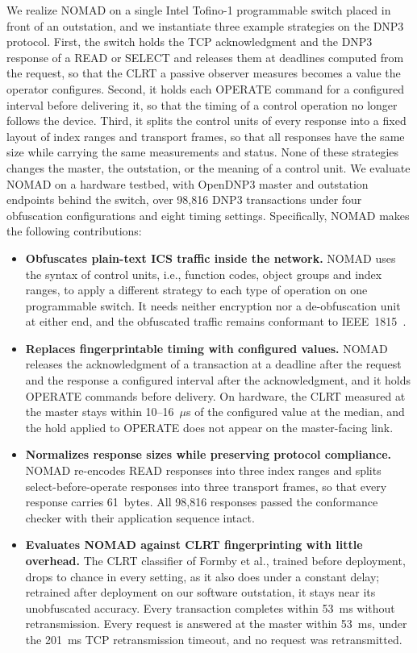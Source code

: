 We realize NOMAD on a single Intel Tofino-1 programmable switch placed in front of an outstation, and we instantiate three example strategies on the DNP3 protocol. First, the switch holds the TCP acknowledgment and the DNP3 response of a READ or SELECT and releases them at deadlines computed from the request, so that the CLRT a passive observer measures becomes a value the operator configures. Second, it holds each OPERATE command for a configured interval before delivering it, so that the timing of a control operation no longer follows the device. Third, it splits the control units of every response into a fixed layout of index ranges and transport frames, so that all responses have the same size while carrying the same measurements and status. None of these strategies changes the master, the outstation, or the meaning of a control unit. We evaluate NOMAD on a hardware testbed, with OpenDNP3 master and outstation endpoints behind the switch, over 98,816 DNP3 transactions under four obfuscation configurations and eight timing settings. Specifically, NOMAD makes the following contributions:

\begin{itemize}[leftmargin=*,labelindent=0pt,topsep=2pt,itemsep=2pt,parsep=0pt]
\item \textbf{Obfuscates plain-text ICS traffic inside the network.} NOMAD uses the syntax of control units, i.e., function codes, object groups and index ranges, to apply a different strategy to each type of operation on one programmable switch. It needs neither encryption nor a de-obfuscation unit at either end, and the obfuscated traffic remains conformant to IEEE~1815~\cite{dnp3std}.
\item \textbf{Replaces fingerprintable timing with configured values.} NOMAD releases the acknowledgment of a transaction at a deadline after the request and the response a configured interval after the acknowledgment, and it holds OPERATE commands before delivery. On hardware, the CLRT measured at the master stays within 10--16~$\mu$s of the configured value at the median, and the hold applied to OPERATE does not appear on the master-facing link.
\item \textbf{Normalizes response sizes while preserving protocol compliance.} NOMAD re-encodes READ responses into three index ranges and splits select-before-operate responses into three transport frames, so that every response carries 61~bytes. All 98,816 responses passed the conformance checker with their application sequence intact.
\item \textbf{Evaluates NOMAD against CLRT fingerprinting with little overhead.} The CLRT classifier of Formby et al., trained before deployment, drops to chance in every setting, as it also does under a constant delay; retrained after deployment on our software outstation, it stays near its unobfuscated accuracy. Every transaction completes within 53~ms without retransmission. Every request is answered at the master within 53~ms, under the 201~ms TCP retransmission timeout, and no request was retransmitted.
\end{itemize}
